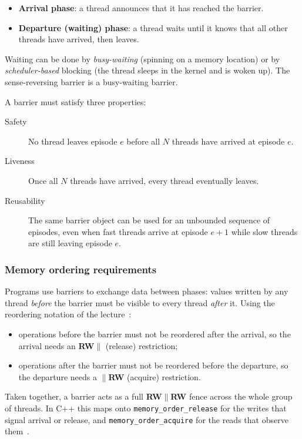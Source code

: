 \begin{itemize}
    \item \textbf{Arrival phase}: a thread announces that it has reached the
          barrier.
    \item \textbf{Departure (waiting) phase}: a thread waits until it knows
          that all other threads have arrived, then leaves.
\end{itemize}

Waiting can be done by \emph{busy-waiting} (spinning on a memory location)
or by \emph{scheduler-based} blocking (the thread sleeps in the kernel and
is woken up). The sense-reversing barrier is a busy-waiting barrier.

A barrier must satisfy three properties:

\begin{description}
    \item[Safety] No thread leaves episode $e$ before all $N$ threads have
          arrived at episode $e$.
    \item[Liveness] Once all $N$ threads have arrived, every thread
          eventually leaves.
    \item[Reusability] The same barrier object can be used for an unbounded
          sequence of episodes, even when fast threads arrive at episode
          $e+1$ while slow threads are still leaving episode $e$.
\end{description}

\subsubsection{Memory ordering requirements}

Programs use barriers to exchange data between phases: values written by
any thread \emph{before} the barrier must be visible to every thread
\emph{after} it. Using the reordering notation of the
lecture~\cite{lecture04}:

\begin{itemize}
    \item operations before the barrier must not be reordered after the
          arrival, so the arrival needs an \textbf{RW$\|$} (release)
          restriction;
    \item operations after the barrier must not be reordered before the
          departure, so the departure needs a \textbf{$\|$RW} (acquire)
          restriction.
\end{itemize}

Taken together, a barrier acts as a full \textbf{RW$\|$RW} fence across the
whole group of threads. In C++ this maps onto
\texttt{memory\_order\_release} for the writes that signal arrival or
release, and \texttt{memory\_order\_acquire} for the reads that observe
them~\cite{cppmemorder}.

